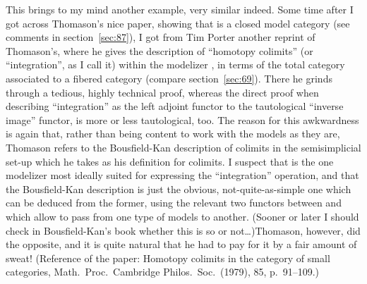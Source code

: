 This brings to my mind another example, very similar indeed. Some time
after I got across Thomason's nice paper, showing that \Cat{} is a
closed model category (see comments in section~\ref{sec:87}), I got
from Tim Porter another reprint of
Thomason's, where he gives the
description of ``homotopy colimits'' (or ``integration'', as I call
it) within the modelizer \Cat, in terms of the total category
associated to a fibered category (compare section~\ref{sec:69}). There
he grinds through a tedious, highly technical proof, whereas the
direct proof when describing ``integration'' as the left adjoint
functor to the tautological ``inverse image'' functor, is more or less
tautological, too. The reason for this awkwardness is again that,
rather than being content to work with the models as they are,
Thomason refers to the
Bousfield-Kan description of
colimits in the semisimplicial set-up which he takes as his definition
for colimits. I suspect that \Cat{} is the one modelizer most ideally
suited for expressing the ``integration'' operation, and that the
Bousfield-Kan description is just the obvious, not-quite-as-simple one
which can be deduced from the former, using the relevant
two functors between \Cat{} and \Simplexhat{} which allow to pass from
one type of models to another. (Sooner or later I should check in
Bousfield-Kan's book whether this is so or not\dots)\enspace Thomason,
however, did the opposite, and it is quite natural that he had to pay
for it by a fair amount of sweat! (Reference of the paper: Homotopy
colimits in the category of small categories, Math.\ Proc.\ Cambridge
Philos.\ Soc.\ (1979), 85, p.~91--109.)

